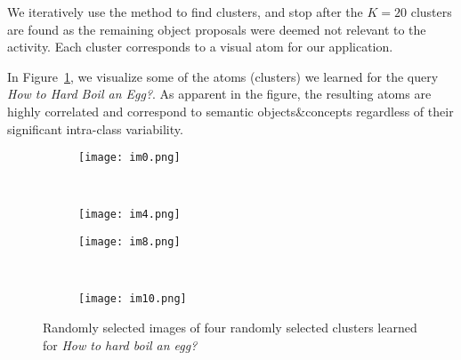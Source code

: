 We iteratively use the method to find clusters, and stop after the $K=20$ clusters are found as the remaining object proposals were deemed not relevant to the activity. Each cluster corresponds to a visual atom for our application.

In Figure~\ref{cvis}, we visualize some of the atoms (\ie clusters) we learned for the query \emph{How to Hard Boil an Egg?}. As apparent in the figure, the resulting atoms are highly correlated and correspond to semantic objects\&concepts regardless of their significant intra-class variability.
\begin{figure}[ht]
  \begin{subfigure}[b]{0.23\textwidth}
\texttt{[image: im0.png]}
\end{subfigure}
~
\begin{subfigure}[b]{0.23\textwidth}
\texttt{[image: im4.png]}
\end{subfigure}


\begin{subfigure}[b]{0.23\textwidth}
\texttt{[image: im8.png]}
\end{subfigure}
~
\begin{subfigure}[b]{0.23\textwidth}
\texttt{[image: im10.png]}
\end{subfigure}
\caption{Randomly selected images of four randomly selected clusters learned for \emph{How to hard boil an egg?}}
\label{cvis}
\vspace{-3mm}
\end{figure}
